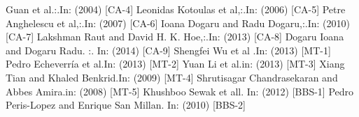 \documentclass[English, runningheads,a4paper]{llncs}
\begin{document}
\begin{thebibliography}{4}
Guan et al.:.In: (2004) [CA-4] 
Leonidas Kotoulas et al,:.In: (2006) [CA-5] 
Petre Anghelescu et al,:.In: (2007) [CA-6] 
Ioana Dogaru and Radu Dogaru,:.In: (2010) [CA-7] 
Lakshman Raut and David H. K. Hoe,:.In: (2013) [CA-8] 
Dogaru Ioana and Dogaru Radu. :. In: (2014) [CA-9] 
Shengfei Wu et al .In: (2013) [MT-1] 
Pedro Echeverría et al.In: (2013) [MT-2] 
Yuan Li et al.in: (2013) [MT-3] 
Xiang Tian and Khaled Benkrid.In: (2009) [MT-4] 
Shrutisagar Chandrasekaran and Abbes Amira.in: (2008) [MT-5] 
Khushboo Sewak et all. In: (2012) [BBS-1] 
Pedro Peris-Lopez and Enrique San Millan. In: (2010) [BBS-2]  
\end{thebibliography}
\end{document}
